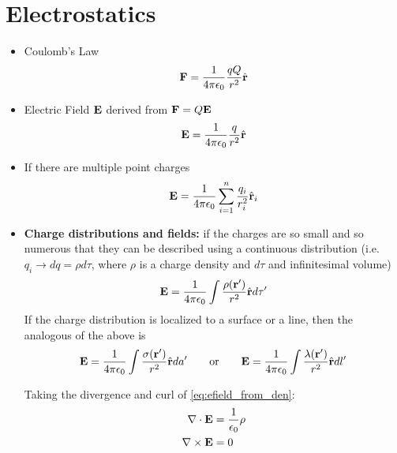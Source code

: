 \documentclass[a4paper,11pt]{report}
\begin{document}
\section{Electrostatics}
\begin{itemize}

\item Coulomb's Law
\begin{equation}
\mathbf{F} = \frac{1}{4 \pi \epsilon_0} \frac{q Q}{r^2} \hat{\mathbf{r}}
\end{equation}

\item Electric Field $\mathbf{E}$ derived from $\mathbf{F} = Q\mathbf{E}$
\begin{equation}
\mathbf{E} = \frac{1}{4 \pi \epsilon_0} \frac{q}{r^2} \hat{\mathbf{r}}
\end{equation}

\item If there are multiple point charges
\begin{equation}
\mathbf{E} = \frac{1}{4 \pi \epsilon_0} \sum_{i=1}^{n} \frac{q_i}{r_i^2} \hat{\mathbf{r}}_i
\end{equation}

\item \textbf{Charge distributions and fields:} if the charges are so small and so numerous that they can be described using a continuous distribution (i.e.\@ $q_i \to dq = \rho d\tau$, where $\rho$ is a charge density and $d\tau$ and infinitesimal volume)
\begin{equation}
\mathbf{E} = \frac{1}{4 \pi \epsilon_0} \int \frac{\rho(\mathbf{r}')}{r^2} \hat{\mathbf{r}} d\tau' \label{eq:efield_from_den}
\end{equation}
If the charge distribution is localized to a surface or a line, then the analogous of the above is
\begin{equation}
    \mathbf{E} = \frac{1}{4 \pi \epsilon_0} \int \frac{\sigma(\mathbf{r}')}{r^2} \hat{\mathbf{r}} da' \qquad \text{or} \qquad \mathbf{E} = \frac{1}{4 \pi \epsilon_0} \int \frac{\lambda(\mathbf{r}')}{r^2} \hat{\mathbf{r}} dl'
\end{equation}

Taking the divergence and curl of \cref{eq:efield_from_den}:
\begin{align}
\nabla \cdot \mathbf{E} &= \frac{1}{\epsilon_0} \rho \\
\nabla \times \mathbf{E} &= 0
\end{align}


\end{itemize}
\end{document}
